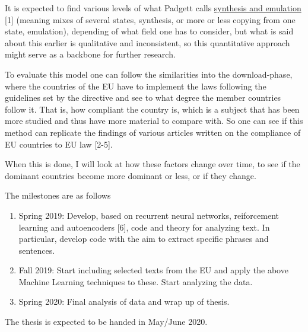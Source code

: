 \documentclass[%
oneside,                 %
final,                   %
10pt]{article}
\begin{document}
It is expected to find various levels of what Padgett calls \href{{http://www.int.washington.edu/PROGRAMS/17-66W/}}{synthesis
and emulation} [1] (meaning mixes of several states,
synthesis, or more or less copying from one state, emulation),
depending of what field one has to consider, but what is said about
this earlier is qualitative and inconsistent, so this quantitative
approach might serve as a backbone for further research.

To evaluate this model one can follow the similarities into the
download-phase, where the countries of the EU have to implement the
laws following the guidelines set by the directive and see to what
degree the member countries follow it. That is, how compliant the
country is, which is a subject that has been more studied and thus
have more material to compare with. So one can see if this method can
replicate the findings of various articles written on the compliance
of EU countries to EU law [2-5].

When this is done, I will look at how these factors change over time,
to see if the dominant countries become more dominant or less, or if
they change.


The milestones are as follows
\begin{enumerate}
\item Spring 2019: Develop, based on recurrent neural networks, reiforcement learning  and autoencoders [6], code and theory for analyzing text. In particular, develop code with the aim to extract specific phrases and sentences. 

\item Fall 2019: Start including selected texts from the EU and apply the above Machine Learning techniques to these. Start analyzing the data.

\item Spring 2020: Final analysis of data and wrap up of thesis. 
\end{enumerate}

\noindent
The thesis is expected to be handed in May/June  2020.
\end{document}
